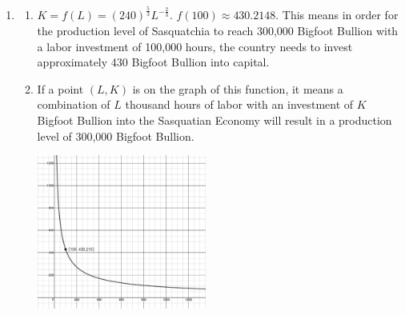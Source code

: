 \begin{enumerate}
\setcounter{enumi}{\value{HW}}
\item \begin{enumerate}

\item $K=f(L) = (240)^{ \frac{5}{3}} L^{- \frac{2}{3}}$.  $f(100)  \approx 430.2148$.  This means in order for the production level of Sasquatchia to reach 300,000 Bigfoot Bullion with a labor investment of 100,000 hours, the country needs to invest approximately 430 Bigfoot Bullion into capital.


\item If a point $(L,K)$ is on the graph of this function, it means a combination of $L$ thousand hours of labor with an investment of $K$ Bigfoot Bullion into the Sasquatian Economy will result in a production level of 300,000 Bigfoot Bullion.

\centerline{\includegraphics[height=2in]{./PowerEqIneqGraphics/CobbDouglasExercise.jpg}}



\end{enumerate}

\end{enumerate}